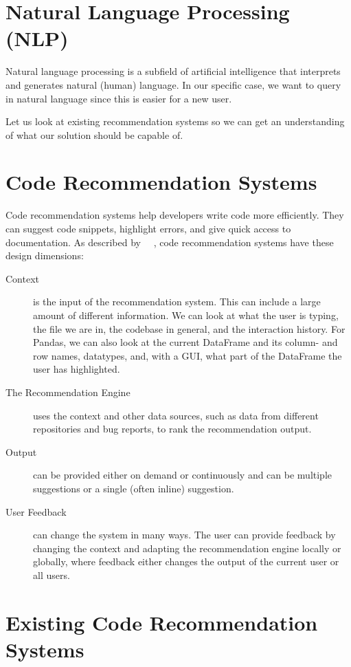 \documentclass[
     12pt,                    %
     a4paper,             %
     BCOR=10mm,     %
     DIV=14,                 %
     listof=totoc,                    %
     bibliography=totoc,       %
     index=totoc,              %
     twoside,
     headsepline
     ]{scrreprt}
\begin{document}
\section{Natural Language Processing (NLP)}

Natural language processing is a subfield of artificial intelligence that interprets and generates natural (human) language. In our specific case, we want to query in natural language since this is easier for a new user.

Let us look at existing recommendation systems so we can get an understanding of what our solution should be capable of.

\section{Code Recommendation Systems}\label{coderecsystems}

Code recommendation systems help developers write code more efficiently. They can suggest code snippets, highlight errors, and give quick access to documentation.
As described by
\citeauthor*{recommendationsystems}~\citeyear{recommendationsystems}~\cite{recommendationsystems}, code recommendation systems have these design dimensions:
\begin{description}
	\item[Context] is the input of the recommendation system. This can include a large amount of different information. We can look at what the user is typing, the file we are in, the codebase in general, and the interaction history. For Pandas, we can also look at the current DataFrame and its column- and row names, datatypes, and, with a GUI, what part of the DataFrame the user has highlighted.
	\item[The Recommendation Engine] uses the context and other data sources, such as data from different repositories and bug reports, to rank the recommendation output.
	\item[Output] can be provided either on demand or continuously and can be multiple suggestions or a single (often inline) suggestion.
	\item[User Feedback] can change the system in many ways. The user can provide feedback by changing the context and adapting the recommendation engine locally or globally, where feedback either changes the output of the current user or all users.
\end{description}

\section{Existing Code Recommendation Systems}
\end{document}

